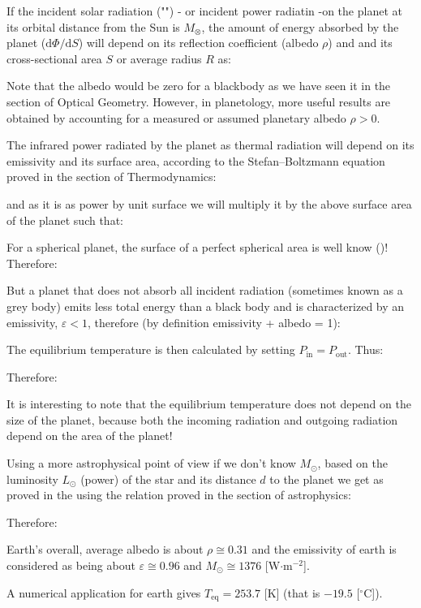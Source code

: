 	If the incident solar radiation ("") - or incident power radiatin -on the planet at its orbital distance from the Sun is $M_\otimes$, the amount of energy absorbed by the planet ($\mathrm{d}\Phi/\mathrm{d}S$) will depend on its reflection coefficient (albedo $\rho$) and and its cross-sectional area $S$ or average radius $R$ as:
	
	Note that the albedo would be zero for a blackbody as we have seen it in the section of Optical Geometry. However, in planetology, more useful results are obtained by accounting for a measured or assumed planetary albedo $\rho>0$.

	The infrared power radiated by the planet as thermal radiation will depend on its emissivity and its surface area, according to the Stefan–Boltzmann equation proved in the section of Thermodynamics:
	
	and as it is as power by unit surface we will multiply it by the above surface area of the planet such that:
	
	 For a spherical planet, the surface of a perfect spherical area is well know ()! Therefore:
	
	But a planet that does not absorb all incident radiation (sometimes known as a grey body) emits less total energy than a black body and is characterized by an emissivity, $\varepsilon< 1$, therefore (by definition emissivity + albedo = 1):
	
	The equilibrium temperature is then calculated by setting $P_\text{in}=P_\text{out}$. Thus:
	
	Therefore:
	
	It is interesting to note that the equilibrium temperature does not depend on the size of the planet, because both the incoming radiation and outgoing radiation depend on the area of the planet!
	
	Using a more astrophysical point of view if we don't know $M_\odot$, based on the luminosity $L_\odot$ (power) of the star and its distance $d$ to the planet we get as proved in the using the relation proved in the section of astrophysics:
	
	Therefore:
	
	
	Earth's overall, average albedo is about $\rho\cong 0.31$ and the emissivity of earth is considered as being about $\varepsilon\cong 0.96$ and $M_\odot\cong 1376$ [W$\cdot$m$^{-2}$].

	A numerical application for earth gives $T_\text{eq}=253.7$ [K] (that is $-19.5$ [$^\circ$C]).

